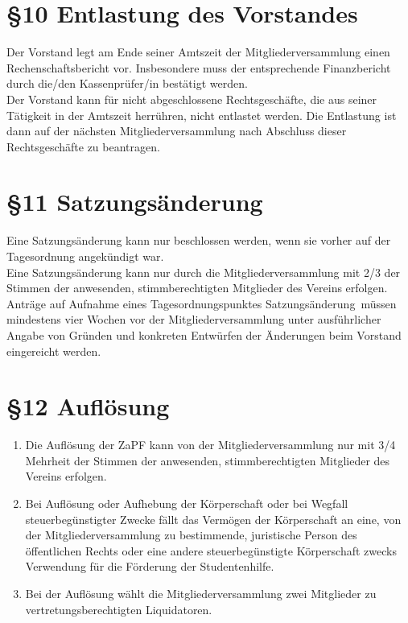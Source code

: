 \documentclass[ngerman]{article}
\begin{document}
\section*{§10 Entlastung des Vorstandes}
Der Vorstand legt am Ende seiner Amtszeit der Mitgliederversammlung einen Rechenschaftsbericht vor. Insbesondere muss der entsprechende Finanzbericht durch die/den Kassenprüfer/in bestätigt werden.\\
Der Vorstand kann für nicht abgeschlossene Rechtsgeschäfte, die aus seiner Tätigkeit in der Amtszeit herrühren, nicht entlastet werden. Die Entlastung ist dann auf der nächsten Mitgliederversammlung nach Abschluss dieser Rechtsgeschäfte zu beantragen.


\section*{§11 Satzungsänderung}
Eine Satzungsänderung kann nur beschlossen werden, wenn sie vorher auf der Tagesordnung angekündigt war.\\
Eine Satzungsänderung kann nur durch die Mitgliederversammlung mit 2/3 der Stimmen der anwesenden, stimmberechtigten Mitglieder des Vereins erfolgen.\\
Anträge auf Aufnahme eines Tagesordnungspunktes \glqq Satzungsänderung\grqq\ müssen mindestens vier Wochen vor der Mitgliederversammlung unter ausführlicher Angabe von Gründen und konkreten Entwürfen der Änderungen beim Vorstand eingereicht werden.


\section*{§12 Auflösung}
\begin{enumerate}
 \item Die Auflösung der ZaPF kann von der Mitgliederversammlung nur mit 3/4 Mehrheit der Stimmen der anwesenden, stimmberechtigten Mitglieder des Vereins erfolgen.
 \item Bei Auflösung oder Aufhebung der Körperschaft oder bei Wegfall steuerbegünstigter Zwecke fällt das Vermögen der Körperschaft an eine, von der Mitgliederversammlung zu bestimmende, juristische Person des öffentlichen Rechts oder eine andere steuerbegünstigte Körperschaft zwecks Verwendung für die Förderung der Studentenhilfe.
 \item Bei der Auflösung wählt die Mitgliederversammlung zwei Mitglieder zu vertretungsberechtigten Liquidatoren.
\end{enumerate}
\end{document}
